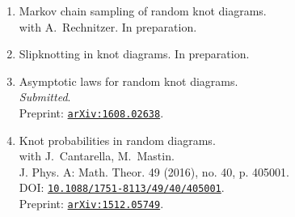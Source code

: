 \documentclass[letterpaper]{article}
\begin{document}
\begin{enumerate}
\item Markov chain sampling of random knot diagrams. \\
  with A.\ Rechnitzer. In preparation.
\item Slipknotting in knot diagrams.
  In preparation.
\item Asymptotic laws for random knot diagrams. \\
  \emph{Submitted}. \\
  Preprint: \href{http://arxiv.org/abs/1608.02638}{\tt arXiv:1608.02638}.
\item Knot probabilities in random diagrams.\\
  with J.\ Cantarella, M.\ Mastin. \\
  J. Phys. A: Math. Theor. 49 (2016), no. 40, p. 405001.\\
  DOI: \href{http://dx.doi.org/10.1088/1751-8113/49/40/405001}{\tt 10.1088/1751-8113/49/40/405001}.\\
  Preprint: \href{http://arxiv.org/abs/1512.05749}{\tt arXiv:1512.05749}.

\end{enumerate}
\end{document}
